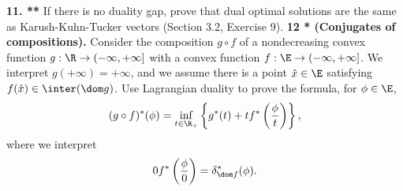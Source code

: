 \documentclass[../borwein-lewis_notes.tex]{subfiles}
\begin{document}
\noindent
\textbf{11. **} If there is no duality gap, prove that dual optimal
solutions are the same as Karush-Kuhn-Tucker vectors (Section 3.2, 
Exercise 9). 
\noindent
\textbf{12 * (Conjugates of compositions).} Consider the composition 
$g\circ f$ of a nondecreasing convex function $g:\R\to(-\infty,+\infty]$
with a convex function $f:\E\to(-\infty,+\infty]$. We interpret 
$g(+\infty)=+\infty$, and we assume there is a point $\hat x\in\E$ 
satisfying $f(\hat x)\in\inter(\dom g)$. Use Lagrangian duality to 
prove the formula, for $\phi\in\E$, 
\begin{equation*}
(g\circ f)^*(\phi) = \inf_{t\in\R_+}\left\{g^*(t) + tf^*\left(
\frac{\phi}{t}\right)\right\},
\end{equation*}
where we interpret 
\begin{equation*}
0f^*\left(\frac{\phi}{0}\right)=\delta^*_{\dom f}(\phi).
\end{equation*}
\end{document}
